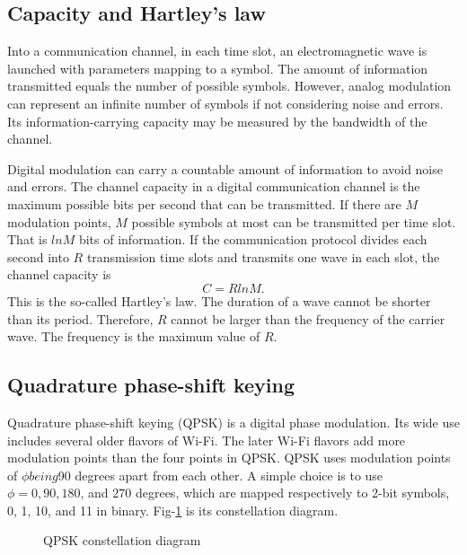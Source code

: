 \documentclass[oneside, letter, 12pt]{book}
\begin{document}
\subsection{Capacity and Hartley's law}
Into a communication channel, in each time slot, an electromagnetic wave is launched with parameters mapping to a symbol. The amount of information transmitted equals the number of possible symbols. However, analog modulation can represent an infinite number of symbols if not considering noise and errors. Its information-carrying capacity may be measured by the bandwidth of the channel.

Digital modulation can carry a countable amount of information to avoid noise and errors. The channel capacity in a digital communication channel is the maximum possible bits per second that can be transmitted. If there are $M$ modulation points, $M$ possible symbols at most can be transmitted per time slot. That is $ln M$ bits of information. If the communication protocol divides each second into $R$ transmission time slots and transmits one wave in each slot, the channel capacity is
\begin{equation}
    C = R ln M.
\end{equation}
This is the so-called Hartley's law. The duration of a wave cannot be shorter than its period. Therefore, $R$ cannot be larger than the frequency of the carrier wave. The frequency is the maximum value of $R$.

\subsection{Quadrature phase-shift keying}
Quadrature phase-shift keying (QPSK) is a digital phase modulation. Its wide use includes several older flavors of Wi-Fi. The later Wi-Fi flavors add more modulation points than the four points in QPSK. QPSK uses modulation points of $\phi being $90 degrees apart from each other. A simple choice is to use $\phi = 0, 90, 180$, and $270$ degrees, which are mapped respectively to 2-bit symbols, 0, 1, 10, and 11 in binary. Fig-\ref{QPSK} is its constellation diagram.

\begin{figure}[h]\label{QPSK}
\caption{QPSK constellation diagram}
\end{figure}
\end{document}
